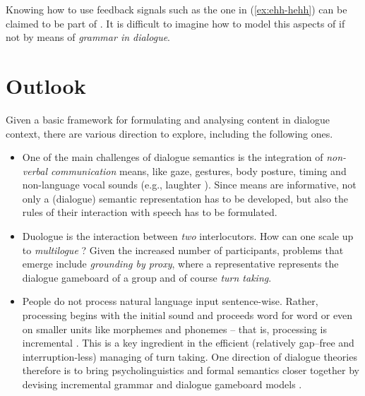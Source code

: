 \documentclass[output=paper]{langsci/langscibook}
\begin{document}
{Knowing how  to use feedback signals   such as the one in (\ref{ex:ehh-hehh}) can be claimed to be part of .
%
It is difficult to imagine how to model this aspects of  if not by means of \emph{grammar in dialogue}.
 





\section{Outlook}
\label{sec:outlook-dialogue}

Given a basic framework for formulating and analysing content in dialogue context, there are various direction to explore, including the following ones.

\begin{itemize}
    \item 
One of the main challenges of dialogue semantics is the integration of \emph{non-verbal communication} means, like gaze, gestures, body posture, timing and non-language  vocal sounds (e.g., laughter \citep{Ginzburg:Breitholz:Cooper:Hough:Tian:2015,Tian:Mazzocconi:Ginzburg:2016}).
%
Since  means are informative, not only a (dialogue) semantic representation has to be developed, but also the rules of their interaction with speech has to be formulated. 

\item Duologue  is the interaction between \emph{two} interlocutors. 
%
How can one scale up to \emph{multilogue}  \citep{Ginzburg:Fernandez:2005}?
%
Given the increased number of participants,  problems that emerge include  \emph{grounding by proxy},  where a representative represents the dialogue gameboard of a group and of course \emph{turn taking}.

\item People do not process natural language input sentence-wise.
%
Rather, processing begins with the initial sound and proceeds word for word or even on smaller units like morphemes and phonemes -- that is, processing is incremental   \citep{Sedivy:Tanenhaus:Chambers:Carlson:1999}. This is a key ingredient in the efficient (relatively gap--free and interruption-less) managing of turn taking.
%
One direction of dialogue theories therefore is to bring psycholinguistics and formal semantics closer together by devising incremental grammar and dialogue gameboard models \citep{Hough:Kennington:Schlangen:Ginzburg:2015,Demberg:Keller:Koller:2013,Poesio:Rieser:2011}.


\end{itemize}}
\end{document}
